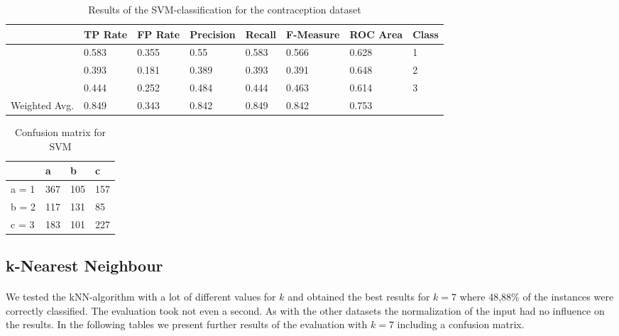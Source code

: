 \documentclass[paper=a4, fontsize=11pt]{scrartcl} %
\numberwithin{equation}{section} %
\numberwithin{figure}{section} %
\numberwithin{table}{section} %
\begin{document}
\begin{table}[h]
\centering
\begin{tabular}{|llllllll|}
	\hline
	&								TP Rate   	&FP Rate   &Precision   &Recall  &F-Measure   &ROC Area  	&Class\\
	\hline
									&0.583     	&0.355     &0.55      	&0.583   &0.566   		&0.628    	&1\\
                 	&0.393     	&0.181     &0.389     	&0.393   &0.391      	&0.648    	&2\\
                 	&0.444     	&0.252     &0.484     	&0.444   &0.463      	&0.614    	&3\\
  \hline
	Weighted Avg.   & 0.849    & 0.343      &0.842   &  0.849     &0.842     & 0.753			&\\
	\hline
\end{tabular}
\caption{Results of the SVM-classification for the contraception dataset}
\end{table}

\vspace{6pt}

\begin{table}[h]
\centering
\begin{tabular}{|l|lll|}
	\hline
	      &a   &b   &c \\
	\hline
	a = 1 &367 &105 &157 \\
 	b = 2 &117 &131 &85 \\
 	c = 3 &183 &101 &227 \\
  \hline
\end{tabular}
\caption{Confusion matrix for SVM}
\end{table}


\subsection{k-Nearest Neighbour}

\paragraph{}We tested the kNN-algorithm with a lot of different values for $k$ and obtained the best results for $k=7$ where 48,88\% of the instances were correctly classified. The evaluation took not even a second. As with the other datasets the normalization of the input had no influence on the results. In the following tables we present further results of the evaluation with $k=7$ including a confusion matrix.
\end{document}
